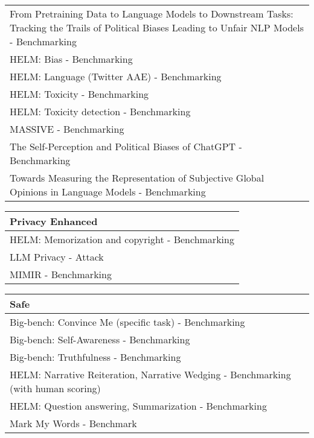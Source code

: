 \documentclass[fleqn]{article}
\begin{document}
\begin{table}[H]
\begin{tabular}{l}
		\makecell[l]{From Pretraining Data to Language Models to Downstream Tasks:\\\hspace{10pt}Tracking the Trails of Political Biases Leading to Unfair NLP Models - Benchmarking} \\
		HELM: Bias - Benchmarking \\
		HELM: Language (Twitter AAE) - Benchmarking \\
		HELM: Toxicity - Benchmarking \\
		HELM: Toxicity detection - Benchmarking \\
		MASSIVE - Benchmarking \\
		The Self-Perception and Political Biases of ChatGPT - Benchmarking \\
		Towards Measuring the Representation of Subjective Global Opinions in Language Models - Benchmarking \\
		\bottomrule
	\end{tabular}
	\newline
	\vspace{10pt}
	\newline
	\begin{tabular}{l}
		\toprule
		Privacy Enhanced \\
		\midrule
		HELM: Memorization and copyright - Benchmarking \\
		LLM Privacy - Attack \\
		MIMIR - Benchmarking \\
	\bottomrule
	\end{tabular}
	\newline
	\vspace{10pt}
	\newline	
	\begin{tabular}{l}
		\toprule
		Safe \\
		\midrule
		Big-bench: Convince Me (specific task) - Benchmarking \\
		Big-bench: Self-Awareness - Benchmarking \\
		Big-bench: Truthfulness - Benchmarking \\
		HELM: Narrative Reiteration, Narrative Wedging - Benchmarking (with human scoring) \\
		HELM: Question answering, Summarization - Benchmarking \\
		Mark My Words - Benchmark \\
		\bottomrule
	\end{tabular}	
\end{table}	
\end{document}
